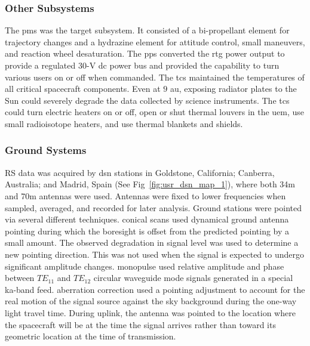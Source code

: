 \documentclass{article}
\begin{document}
            \subsubsection{\footnotesize{Other Subsystems}}
                \label{subsubsec:usr_other_subsys}
                The \gls{pms} was the target subsystem. It
                consisted of a bi-propellant element for
                trajectory changes and a \gls{hydrazine} element
                for attitude control, small maneuvers, and
                reaction wheel desaturation. The \gls{pps}
                converted the \gls{rtg} power output to provide
                a regulated 30-V \gls{dc} power bus and provided
                the capability to turn various users on or off
                when commanded. The \gls{tcs} maintained the
                temperatures of all critical spacecraft
                components. Even at $9$ \gls{au}, exposing
                radiator plates to the Sun could severely degrade
                the data collected by science instruments. The
                \gls{tcs} could turn electric heaters on or off,
                open or shut thermal louvers in the \gls{uem},
                use small radioisotope heaters, and use thermal
                blankets and shields.
            \subsubsection{\footnotesize{Ground Systems}}
                \label{subsubsec:usr_ground_sys}
                RS data was acquired by \gls{dsn} stations in
                Goldstone, California; Canberra, Australia;
                and Madrid, Spain
                (See Fig~\ref{fig:usr_dsn_map_1}),
                where both 34m and 70m antennas were used.
                Antennas were fixed to lower frequencies when
                sampled, averaged, and recorded for later
                analysis. Ground stations were pointed via
                several different techniques. \Glspl{conical scan}
                used dynamical ground antenna pointing during
                which the boresight is offset from the predicted
                pointing by a small amount. The observed
                degradation in signal level was used to determine
                a new pointing direction. This was not used when
                the signal is expected to undergo significant
                amplitude changes. \Gls{monopulse} used relative
                amplitude and phase between $TE_{11}$ and
                $TE_{12}$ circular \gls{waveguide} mode signals
                generated in a special \gls{ka-band} feed.
                \Gls{aberration correction} used a pointing
                adjustment to account for the real motion of
                the signal source against the sky background
                during the one-way light travel time. During
                \gls{uplink}, the antenna was pointed to the
                location where the spacecraft will be at the
                time the signal arrives rather than toward its
                geometric location at the time of transmission.
\end{document}
